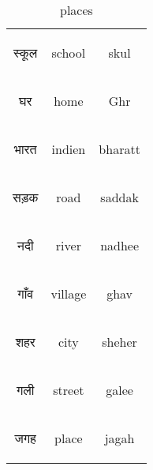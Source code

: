 \begin{table}[H]
    \centering 
    \begin{tabular}{c|c|c}
        \begin{hindi} स्कूल \end{hindi} & school & skul \\
        \begin{hindi} घर \end{hindi} & home & Ghr \\
        \begin{hindi} भारत \end{hindi} & indien & bharatt \\
        \begin{hindi} सड़क \end{hindi} & road & saddak \\
        \begin{hindi} नदी \end{hindi} & river & nadhee \\  
        \begin{hindi} गाँव \end{hindi} & village & ghav \\  
        \begin{hindi} शहर \end{hindi} & city & sheher \\  
        \begin{hindi}   गली\end{hindi} & street & galee \\  
   \begin{hindi}   जगह \end{hindi} & place & jagah \\  
    \end{tabular}
    \caption{places}
    \label{tab:nouns_places}
\end{table}

